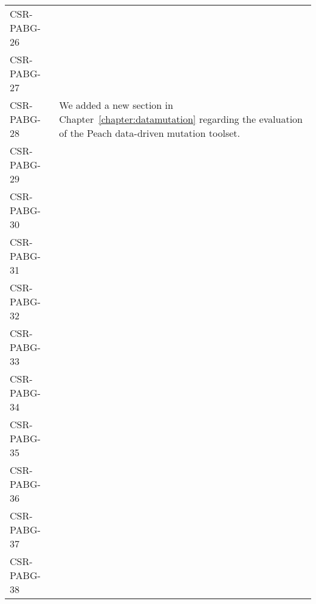 \begin{longtable}{|p{1.5cm}|p{12cm}|@{}}
\begin{minipage}{12cm}
\end{minipage}\\
\hline
CSR-PABG-26&
\begin{minipage}{12cm}
\end{minipage}\\
\hline
CSR-PABG-27&
\begin{minipage}{12cm}
\end{minipage}\\
\hline
CSR-PABG-28&
\begin{minipage}{12cm}
We added a new section in Chapter~\ref{chapter:datamutation} regarding the evaluation of the Peach data-driven mutation toolset.
\end{minipage}\\
\hline
CSR-PABG-29&
\begin{minipage}{12cm}
\end{minipage}\\
\hline
CSR-PABG-30&
\begin{minipage}{12cm}
\end{minipage}\\
\hline
CSR-PABG-31&
\begin{minipage}{12cm}
\end{minipage}\\
\hline
CSR-PABG-32&
\begin{minipage}{12cm}
\end{minipage}\\
\hline
CSR-PABG-33&
\begin{minipage}{12cm}
\end{minipage}\\
\hline
CSR-PABG-34&
\begin{minipage}{12cm}
\end{minipage}\\
\hline
CSR-PABG-35&
\begin{minipage}{12cm}
\end{minipage}\\
\hline
CSR-PABG-36&
\begin{minipage}{12cm}
\end{minipage}\\
\hline
CSR-PABG-37&
\begin{minipage}{12cm}
\end{minipage}\\
\hline
CSR-PABG-38&
\begin{minipage}{12cm}
\end{minipage}\\

\end{longtable}
